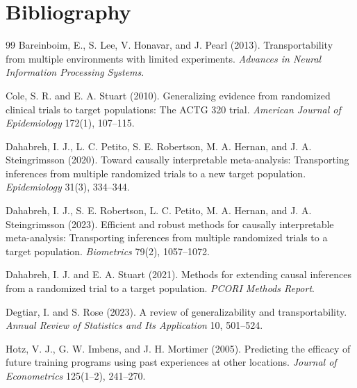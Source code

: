 \documentclass[11pt]{article}
\theoremstyle{definition}
\theoremstyle{plain}
\theoremstyle{remark}
\begin{document}
\section*{Bibliography}
\begin{thebibliography}{99}
Bareinboim, E., S. Lee, V. Honavar, and J. Pearl (2013).
\newblock Transportability from multiple environments with limited experiments.
\newblock \emph{Advances in Neural Information Processing Systems}.

Cole, S. R. and E. A. Stuart (2010).
\newblock Generalizing evidence from randomized clinical trials to target populations: The ACTG 320 trial.
\newblock \emph{American Journal of Epidemiology} 172(1), 107--115.

Dahabreh, I. J., L. C. Petito, S. E. Robertson, M. A. Hernan, and J. A. Steingrimsson (2020).
\newblock Toward causally interpretable meta-analysis: Transporting inferences from multiple randomized trials to a new target population.
\newblock \emph{Epidemiology} 31(3), 334--344.

Dahabreh, I. J., S. E. Robertson, L. C. Petito, M. A. Hernan, and J. A. Steingrimsson (2023).
\newblock Efficient and robust methods for causally interpretable meta-analysis: Transporting inferences from multiple randomized trials to a target population.
\newblock \emph{Biometrics} 79(2), 1057--1072.

Dahabreh, I. J. and E. A. Stuart (2021).
\newblock Methods for extending causal inferences from a randomized trial to a target population.
\newblock \emph{PCORI Methods Report}.

Degtiar, I. and S. Rose (2023).
\newblock A review of generalizability and transportability.
\newblock \emph{Annual Review of Statistics and Its Application} 10, 501--524.

Hotz, V. J., G. W. Imbens, and J. H. Mortimer (2005).
\newblock Predicting the efficacy of future training programs using past experiences at other locations.
\newblock \emph{Journal of Econometrics} 125(1--2), 241--270.


\end{thebibliography}
\end{document}
